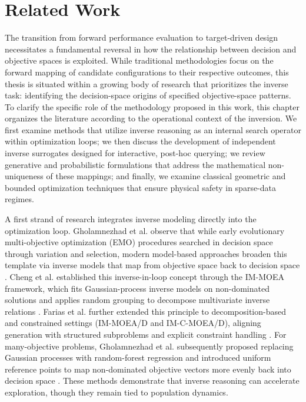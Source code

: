 \chapter{Related Work}\label{chap:related}

The transition from forward performance evaluation to target-driven design necessitates a fundamental reversal in how the relationship between decision and objective spaces is exploited. While traditional methodologies focus on the forward mapping of candidate configurations to their respective outcomes, this thesis is situated within a growing body of research that prioritizes the inverse task: identifying the decision-space origins of specified objective-space patterns. To clarify the specific role of the methodology proposed in this work, this chapter organizes the literature according to the operational context of the inversion. We first examine methods that utilize inverse reasoning as an internal search operator within optimization loops; we then discuss the development of independent inverse surrogates designed for interactive, post-hoc querying; we review generative and probabilistic formulations that address the mathematical non-uniqueness of these mappings; and finally, we examine classical geometric and bounded optimization techniques that ensure physical safety in sparse-data regimes.

A first strand of research integrates inverse modeling directly into the optimization loop. Gholamnezhad et al. observe that while early evolutionary multi-objective optimization (EMO) procedures searched in decision space through variation and selection, modern model-based approaches broaden this template via inverse models that map from objective space back to decision space \cite{Gholamnezhad2022}. Cheng et al. established this inverse-in-loop concept through the IM-MOEA framework, which fits Gaussian-process inverse models on non-dominated solutions and applies random grouping to decompose multivariate inverse relations \cite{Cheng2015IMMOEA}. Farias et al. further extended this principle to decomposition-based and constrained settings (IM-MOEA/D and IM-C-MOEA/D), aligning generation with structured subproblems and explicit constraint handling \cite{FariasA21}. For many-objective problems, Gholamnezhad et al. subsequently proposed replacing Gaussian processes with random-forest regression and introduced uniform reference points to map non-dominated objective vectors more evenly back into decision space \cite{Gholamnezhad2022}. These methods demonstrate that inverse reasoning can accelerate exploration, though they remain tied to population dynamics.



